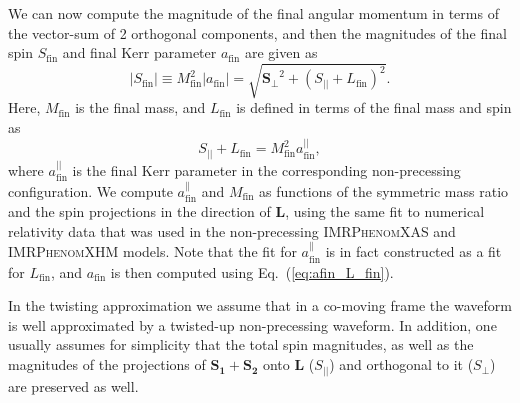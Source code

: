 \documentclass[%
aps,
prd,
amssymb,
amsmath,
amsfonts,
eqsecnum,
showpacs,
nofootinbib,
floatfix,
twocolumn,
twoside,
a4paper,
superscriptaddress
]{revtex4-1}
\newcommand{\phX}{\textsc{IMRPhenomXAS}\xspace}
\newcommand{\phXHM}{\textsc{IMRPhenomXHM}\xspace}
\begin{document}
We can now compute the magnitude of the final angular momentum in terms of the vector-sum of 2 orthogonal components, and then the magnitudes of the final spin $S_\mathrm{fin}$ and final Kerr parameter $a_\mathrm{fin}$ are given as
\begin{equation}
    \label{eq:afin_nolambda}
\vert S_{\mathrm{fin}}  \vert \equiv  M_\mathrm{fin}^2 \vert a_\mathrm{fin} \vert = \sqrt{\mathbf{S_\perp}^2 + (S_{\vert\vert} +L_\mathrm{fin})^2}.
\end{equation}
Here, $M_\mathrm{fin}$ is the final mass, and $L_\mathrm{fin}$ is defined in terms of the final mass and spin as
\begin{equation}
    \label{eq:afin_L_fin}
S_{\vert\vert} + L_\mathrm{fin} = M_\mathrm{fin}^2 a_\mathrm{fin}^{\vert\vert}, 
\end{equation}
where $a_\mathrm{fin}^{\vert\vert}$ is the final Kerr parameter in the corresponding non-precessing configuration.
We compute $a^\parallel_\mathrm{fin}$ and $M_\mathrm{fin}$ as functions of the symmetric mass ratio and the spin projections in the direction of $\mathbf{L}$, using the same fit to numerical relativity data \cite{Jimenez-Forteza:2016oae} that was used in the non-precessing \phX and \phXHM models.
Note that the fit for $a^\parallel_\mathrm{fin}$ is in fact constructed as a fit for $L_\mathrm{fin}$, and $a_\mathrm{fin}$ is then computed using Eq.~(\ref{eq:afin_L_fin}).

In the twisting approximation we assume that
in a co-moving frame the waveform is well approximated by a twisted-up non-precessing waveform. In addition, one usually assumes for simplicity that the total spin magnitudes, as well as the magnitudes of the projections of $\mathbf{S_1}  + \mathbf{S_2}$ onto ${\mathbf L}$ ($S_{\vert\vert}$) and orthogonal to it ($S_{\perp}$) are preserved as well. 
\end{document}
